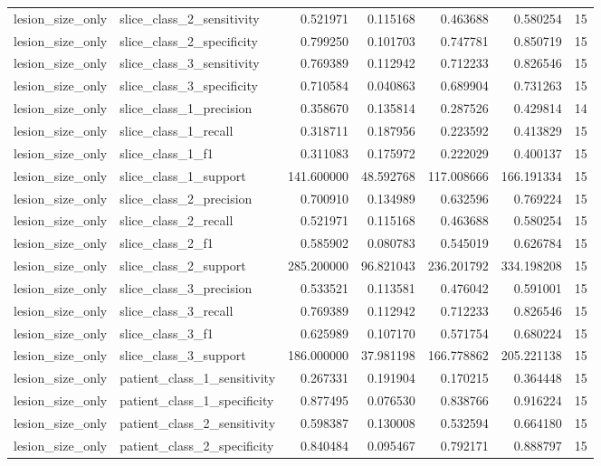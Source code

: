 \begin{tabular}{llrrrrr}
lesion_size_only & slice_class_2_sensitivity & 0.521971 & 0.115168 & 0.463688 & 0.580254 & 15 \\
lesion_size_only & slice_class_2_specificity & 0.799250 & 0.101703 & 0.747781 & 0.850719 & 15 \\
lesion_size_only & slice_class_3_sensitivity & 0.769389 & 0.112942 & 0.712233 & 0.826546 & 15 \\
lesion_size_only & slice_class_3_specificity & 0.710584 & 0.040863 & 0.689904 & 0.731263 & 15 \\
lesion_size_only & slice_class_1_precision & 0.358670 & 0.135814 & 0.287526 & 0.429814 & 14 \\
lesion_size_only & slice_class_1_recall & 0.318711 & 0.187956 & 0.223592 & 0.413829 & 15 \\
lesion_size_only & slice_class_1_f1 & 0.311083 & 0.175972 & 0.222029 & 0.400137 & 15 \\
lesion_size_only & slice_class_1_support & 141.600000 & 48.592768 & 117.008666 & 166.191334 & 15 \\
lesion_size_only & slice_class_2_precision & 0.700910 & 0.134989 & 0.632596 & 0.769224 & 15 \\
lesion_size_only & slice_class_2_recall & 0.521971 & 0.115168 & 0.463688 & 0.580254 & 15 \\
lesion_size_only & slice_class_2_f1 & 0.585902 & 0.080783 & 0.545019 & 0.626784 & 15 \\
lesion_size_only & slice_class_2_support & 285.200000 & 96.821043 & 236.201792 & 334.198208 & 15 \\
lesion_size_only & slice_class_3_precision & 0.533521 & 0.113581 & 0.476042 & 0.591001 & 15 \\
lesion_size_only & slice_class_3_recall & 0.769389 & 0.112942 & 0.712233 & 0.826546 & 15 \\
lesion_size_only & slice_class_3_f1 & 0.625989 & 0.107170 & 0.571754 & 0.680224 & 15 \\
lesion_size_only & slice_class_3_support & 186.000000 & 37.981198 & 166.778862 & 205.221138 & 15 \\
lesion_size_only & patient_class_1_sensitivity & 0.267331 & 0.191904 & 0.170215 & 0.364448 & 15 \\
lesion_size_only & patient_class_1_specificity & 0.877495 & 0.076530 & 0.838766 & 0.916224 & 15 \\
lesion_size_only & patient_class_2_sensitivity & 0.598387 & 0.130008 & 0.532594 & 0.664180 & 15 \\
lesion_size_only & patient_class_2_specificity & 0.840484 & 0.095467 & 0.792171 & 0.888797 & 15 \\

\end{tabular}
